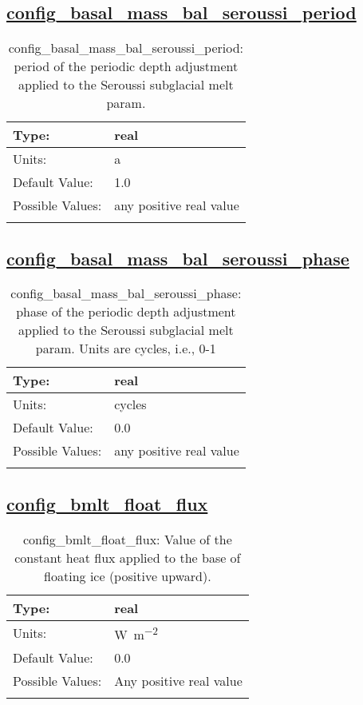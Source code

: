 \subsection[config\_basal\_mass\_bal\_seroussi\_period]{\hyperref[sec:nm_tab_thermal_solver]{config\_basal\_mass\_bal\_seroussi\_period}}
\label{subsec:nm_sec_config_basal_mass_bal_seroussi_period}
\begin{center}
\begin{longtable}{| p{2.0in} || p{4.0in} |}
    \hline
    Type: & real \\
    \hline
    Units: & \si{a} \\
    \hline
    Default Value: & 1.0 \\
    \hline
    Possible Values: & any positive real value \\
    \hline
    \caption{config\_basal\_mass\_bal\_seroussi\_period: period of the periodic depth adjustment applied to the Seroussi subglacial melt param.}
\end{longtable}
\end{center}
\subsection[config\_basal\_mass\_bal\_seroussi\_phase]{\hyperref[sec:nm_tab_thermal_solver]{config\_basal\_mass\_bal\_seroussi\_phase}}
\label{subsec:nm_sec_config_basal_mass_bal_seroussi_phase}
\begin{center}
\begin{longtable}{| p{2.0in} || p{4.0in} |}
    \hline
    Type: & real \\
    \hline
    Units: & \si{cycles} \\
    \hline
    Default Value: & 0.0 \\
    \hline
    Possible Values: & any positive real value \\
    \hline
    \caption{config\_basal\_mass\_bal\_seroussi\_phase: phase of the periodic depth adjustment applied to the Seroussi subglacial melt param. Units are cycles, i.e., 0-1}
\end{longtable}
\end{center}
\subsection[config\_bmlt\_float\_flux]{\hyperref[sec:nm_tab_thermal_solver]{config\_bmlt\_float\_flux}}
\label{subsec:nm_sec_config_bmlt_float_flux}
\begin{center}
\begin{longtable}{| p{2.0in} || p{4.0in} |}
    \hline
    Type: & real \\
    \hline
    Units: & \si{W.m^{-2}} \\
    \hline
    Default Value: & 0.0 \\
    \hline
    Possible Values: & Any positive real value \\
    \hline
    \caption{config\_bmlt\_float\_flux: Value of the constant heat flux applied to the base of floating ice (positive upward).}
\end{longtable}
\end{center}
